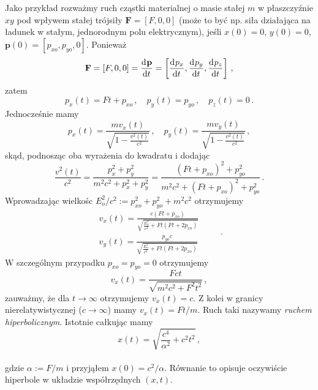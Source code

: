 \documentclass[../main.tex]{subfiles}
\begin{document}
Jako przykład rozważmy ruch cząstki materialnej o masie stałej \(m\) w płaszczyźnie \(xy\) pod
wpływem stałej trójsiły \(\mathbf{F}=[F,0,0]\) (może to być np. siła działająca na ładunek w stałym,
jednorodnym polu elektrycznym), jeśli \(x(0)=0\), \(y(0)=0\), \(\mathbf{p}(0)=[p_{xo},p_{yo},0]\).
Ponieważ
\begin{equation*}
    \mathbf{F}=[F,0,0]=\dv[]{\mathbf{p}}{t}=\left[\dv[]{p_x}{t},\dv[]{p_y}{t},\dv[]{p_z}{t}\right]\,,
\end{equation*}
zatem
\begin{equation*}
    p_x(t)=Ft+p_{xo}\,,\quad p_y(t)=p_{yo}\,,\quad p_z(t)=0\,.
\end{equation*}
Jednocześnie mamy
\begin{equation*}
    p_x(t)=\frac{mv_x(t)}{\sqrt{1-\frac{v^2(t)}{c^2}}}\,,\quad p_y(t)=\frac{mv_y(t)}{\sqrt{1-\frac{v^2(t)}{c^2}}}\,,
\end{equation*}
skąd, podnosząc oba wyrażenia do kwadratu i dodając
\begin{equation*}
    \frac{v^2(t)}{c^2}=\frac{p_x^2+p_y^2}{m^2c^2+p_x^2+p_y^2}=\frac{(Ft+p_{xo})^2+p^2_{yo}}{m^2c^2+(Ft+p_{xo})^2+p^2_{yo}}\,.
\end{equation*}
Wprowadzając wielkośc \(E_o^2/c^2:=p_{xo}^2+p_{yo}^2+m^2c^2\) otrzymujemy
\begin{equation*}
\begin{split}
    v_x(t)=\frac{c(Ft+p_{xo})}{\sqrt{\frac{E_o^2}{c^2}+Ft(Ft+2p_{xo})}}\\
    v_y(t)=\frac{p_{yo}c}{\sqrt{\frac{E_o^2}{c^2}+Ft(Ft+2p_{xo})}}
\end{split}\quad\quad\,.
\end{equation*}
W szczególnym przypadku \(p_{xo}=p_{yo}=0\) otrzymujemy
\begin{equation*}
    v_x(t)=\frac{Fct}{\sqrt{m^2c^2+F^2t^2}}\,,
\end{equation*}
zauważmy, że dla \(t\to\infty\) otrzymujemy \(v_x(t)=c\). Z kolei w granicy nierelatywistycznej
(\(c\to\infty\)) mamy \(v_x(t)=Ft/m\). Ruch taki nazywamy \textit{ruchem hiperbolicznym}. Istotnie
całkując mamy
\begin{equation*}
    x(t)=\sqrt{\frac{c^4}{\alpha^2}+c^2t^2}\,,
\end{equation*}\\
gdzie \(\alpha:=F/m\) i przyjąłem \(x(0)=c^2/\alpha\). Równanie to opisuje oczywiście hiperbole w
układzie współrzędnych \((x,t)\).
\end{document}
